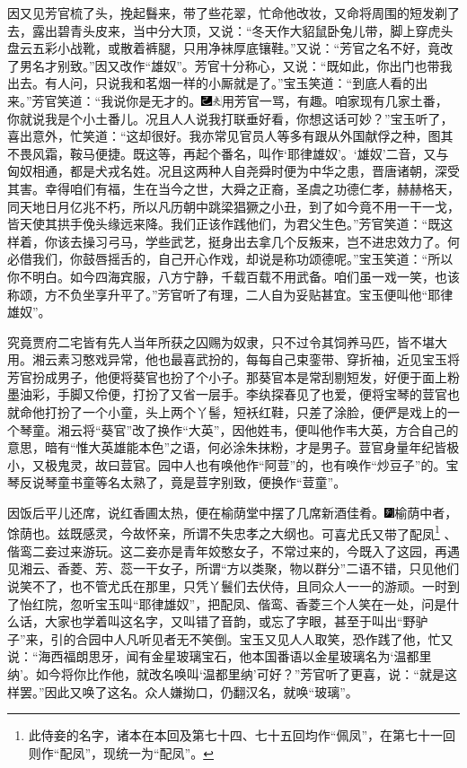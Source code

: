 因又见芳官梳了头，挽起䰖来，带了些花翠，忙命他改妆，又命将周围的短发剃了去，露出碧青头皮来，当中分大顶，又说：“冬天作大貂鼠卧兔儿带，脚上穿虎头盘云五彩小战靴，或散着裤腿，只用净袜厚底镶鞋。”又说：“芳官之名不好，竟改了男名才别致。”因又改作“雄奴”。芳官十分称心，又说：“既如此，你出门也带我出去。有人问，只说我和茗烟一样的小厮就是了。”宝玉笑道：“到底人看的出来。”芳官笑道：“我说你是无才的。{\includegraphics[width=3mm]{../Images/00003}\includegraphics[width=3mm]{../Images/00012}\footnotesize \kaishu 用芳官一骂，有趣。}咱家现有几家土番，你就说我是个小土番儿。况且人人说我打联垂好看，你想这话可妙？”宝玉听了，喜出意外，忙笑道：“这却很好。我亦常见官员人等多有跟从外国献俘之种，图其不畏风霜，鞍马便捷。既这等，再起个番名，叫作‘耶律雄奴’。‘雄奴’二音，又与匈奴相通，都是犬戎名姓。况且这两种人自尧舜时便为中华之患，晋唐诸朝，深受其害。幸得咱们有福，生在当今之世，大舜之正裔，圣虞之功德仁孝，赫赫格天，同天地日月亿兆不朽，所以凡历朝中跳梁猖獗之小丑，到了如今竟不用一干一戈，皆天使其拱手俛头缘远来降。我们正该作践他们，为君父生色。”芳官笑道：“既这样着，你该去操习弓马，学些武艺，挺身出去拿几个反叛来，岂不进忠效力了。何必借我们，你鼓唇摇舌的，自己开心作戏，却说是称功颂德呢。”宝玉笑道：“所以你不明白。如今四海宾服，八方宁静，千载百载不用武备。咱们虽一戏一笑，也该称颂，方不负坐享升平了。”芳官听了有理，二人自为妥贴甚宜。宝玉便叫他“耶律雄奴”。

究竟贾府二宅皆有先人当年所获之囚赐为奴隶，只不过令其饲养马匹，皆不堪大用。湘云素习憨戏异常，他也最喜武扮的，每每自己束銮带、穿折袖，近见宝玉将芳官扮成男子，他便将葵官也扮了个小子。那葵官本是常刮剔短发，好便于面上粉墨油彩，手脚又伶便，打扮了又省一层手。李纨探春见了也爱，便将宝琴的荳官也就命他打扮了一个小童，头上两个丫髻，短袄红鞋，只差了涂脸，便俨是戏上的一个琴童。湘云将“葵官”改了换作“大英”，因他姓韦，便叫他作韦大英，方合自己的意思，暗有“惟大英雄能本色”之语，何必涂朱抹粉，才是男子。荳官身量年纪皆极小，又极鬼灵，故曰荳官。园中人也有唤他作“阿荳”的，也有唤作“炒豆子”的。宝琴反说琴童书童等名太熟了，竟是荳字别致，便换作“荳童”。

因饭后平儿还席，说红香圃太热，便在榆荫堂中摆了几席新酒佳肴。{\includegraphics[width=3mm]{../Images/00007}榆荫中者，馀荫也。兹既感灵，今故怀亲，所谓不失忠孝之大纲也。}可喜尤氏又带了配凤\footnote{此侍妾的名字，诸本在本回及第七十四、七十五回均作“佩凤”，在第七十一回则作“配凤”，现统一为“配凤”。}
、偕鸾二妾过来游玩。这二妾亦是青年姣憨女子，不常过来的，今既入了这园，再遇见湘云、香菱、芳、蕊一干女子，所谓“方以类聚，物以群分”二语不错，只见他们说笑不了，也不管尤氏在那里，只凭丫鬟们去伏侍，且同众人一一的游顽。一时到了怡红院，忽听宝玉叫“耶律雄奴”，把配凤、偕鸾、香菱三个人笑在一处，问是什么话，大家也学着叫这名字，又叫错了音韵，或忘了字眼，甚至于叫出“野驴子”来，引的合园中人凡听见者无不笑倒。宝玉又见人人取笑，恐作践了他，忙又说：“海西福朗思牙，闻有金星玻璃宝石，他本国番语以金星玻璃名为‘温都里纳’。如今将你比作他，就改名唤叫‘温都里纳’可好？”芳官听了更喜，说：“就是这样罢。”因此又唤了这名。众人嫌拗口，仍翻汉名，就唤“玻璃”。

